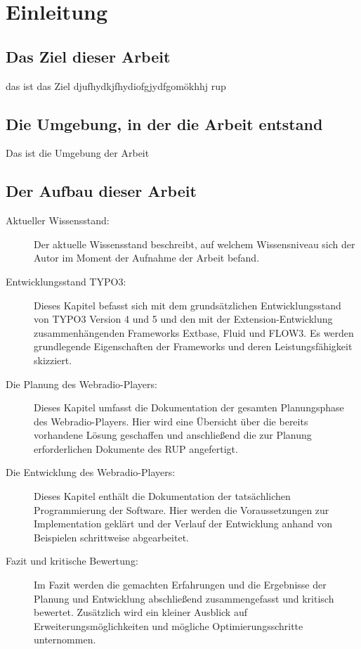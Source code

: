 
\chapter{Einleitung}
\label{cha:Einleitung}


\section{Das Ziel dieser Arbeit}
\label{sec:ZielDerArbeit}
das ist das Ziel 
djufhydkjfhydiofgjydfgomökhhj \gls{rup}

\section{Die Umgebung, in der die Arbeit entstand}
\label{sec:EntstehungsUmgebungArbeit}

Das ist die Umgebung der Arbeit

\section{Der Aufbau dieser Arbeit}
\label{sec:AufbauDieserArbeit}



\begin{description}

	\item[Aktueller Wissensstand:] Der aktuelle Wissensstand beschreibt, auf welchem Wissensniveau sich der Autor im Moment der Aufnahme der Arbeit befand.
	
	\item[Entwicklungsstand TYPO3:] Dieses Kapitel befasst sich mit dem grunds\"atzlichen Entwicklungsstand von TYPO3 Version 4 und 5 und den mit der Extension-Entwicklung zusammenh\"angenden Frameworks Extbase, Fluid und FLOW3. Es werden grundlegende Eigenschaften der Frameworks und deren Leistungsf\"ahigkeit skizziert.
	
	\item[Die Planung des Webradio-Players:] Dieses Kapitel umfasst die Dokumentation der gesamten Planungsphase des Webradio-Players. Hier wird eine Übersicht über die bereits vorhandene Lösung geschaffen und anschließend die zur Planung erforderlichen Dokumente des RUP angefertigt.
	
	\item[Die Entwicklung des Webradio-Players:] Dieses Kapitel enthält die Dokumentation der tatsächlichen Programmierung der Software. Hier werden die Voraussetzungen zur Implementation geklärt und der Verlauf der Entwicklung anhand von Beispielen schrittweise abgearbeitet.
	
	\item[Fazit und kritische Bewertung:] Im Fazit werden die gemachten Erfahrungen und die Ergebnisse der Planung und Entwicklung abschließend zusammengefasst und kritisch bewertet. Zusätzlich wird ein kleiner Ausblick auf Erweiterungsmöglichkeiten und mögliche Optimierungsschritte unternommen.

\end{description}


